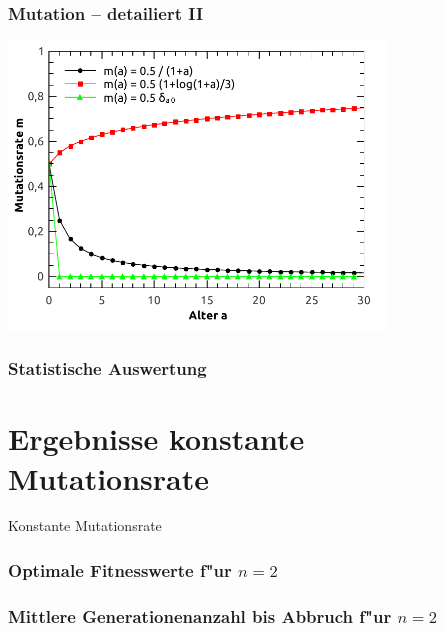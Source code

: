 \documentclass[]{beamer}
\begin{document}
\begin{frame}\frametitle{Mutation -- detailiert II} 

    \centering
    \includegraphics[width=10cm]{abbildungen/mutationsrate.pdf}
    
\end{frame}


\begin{frame}\frametitle{Statistische Auswertung} 

\end{frame}


\section{Ergebnisse konstante Mutationsrate} 

\begin{frame}
    \begin{center}
	\LARGE{Konstante Mutationsrate}
    \end{center}
\end{frame}

\begin{frame}\frametitle{Optimale Fitnesswerte f"ur $n = 2$} 

\end{frame}

\begin{frame}\frametitle{Mittlere Generationenanzahl bis Abbruch f"ur $n = 2$} 

\end{frame}

\end{document}
